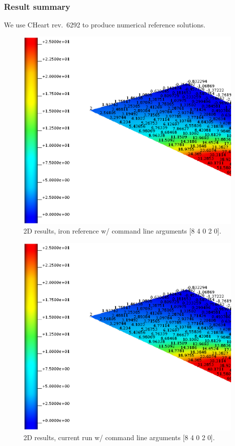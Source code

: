 \subsubsection{Result summary}
%
We use CHeart rev.\ 6292 to produce numerical reference solutions.
%


%
\begin{figure}[h!]
    \centering 
    \includegraphics[width=0.9\columnwidth]{examples/example-0004/doc/figures/iron_reference_2D.eps} 
    \caption{2D results, iron reference w/ command line arguments [8 4 0 2 0].}
    \label{example-0004-iron-2D-reference-fig}
\end{figure}
%
\begin{figure}[h!]
    \centering 
    \includegraphics[width=0.9\columnwidth]{examples/example-0004/doc/figures/current_run_l4x2x0_n8x4x0_i2_s0.eps} 
    \caption{2D results, current run w/ command line arguments [8 4 0 2 0].}
    \label{example-0004-current-run-2D-fig}
\end{figure}
%

